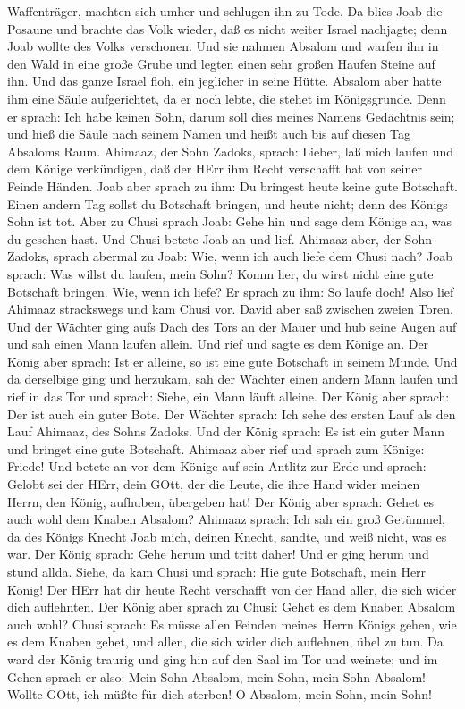 Waffenträger, machten sich umher und schlugen ihn zu Tode. 
Da blies Joab die Posaune und brachte das Volk wieder, daß es nicht
weiter Israel nachjagte; denn Joab wollte des Volks verschonen.
 Und sie nahmen Absalom und warfen ihn in den Wald in eine
große Grube und legten einen sehr großen Haufen Steine auf ihn. Und das
ganze Israel floh, ein jeglicher in seine Hütte.  Absalom
aber hatte ihm eine Säule aufgerichtet, da er noch lebte, die stehet im
Königsgrunde. Denn er sprach: Ich habe keinen Sohn, darum soll dies
meines Namens Gedächtnis sein; und hieß die Säule nach seinem Namen und
heißt auch bis auf diesen Tag Absaloms Raum.  Ahimaaz, der
Sohn Zadoks, sprach: Lieber, laß mich laufen und dem Könige verkündigen,
daß der HErr ihm Recht verschafft hat von seiner Feinde Händen.
 Joab aber sprach zu ihm: Du bringest heute keine gute
Botschaft. Einen andern Tag sollst du Botschaft bringen, und heute
nicht; denn des Königs Sohn ist tot.  Aber zu Chusi sprach
Joab: Gehe hin und sage dem Könige an, was du gesehen hast. Und Chusi
betete Joab an und lief.  Ahimaaz aber, der Sohn Zadoks,
sprach abermal zu Joab: Wie, wenn ich auch liefe dem Chusi nach? Joab
sprach: Was willst du laufen, mein Sohn? Komm her, du wirst nicht eine
gute Botschaft bringen.  Wie, wenn ich liefe? Er sprach zu
ihm: So laufe doch! Also lief Ahimaaz strackswegs und kam Chusi vor.
 David aber saß zwischen zweien Toren. Und der Wächter ging
aufs Dach des Tors an der Mauer und hub seine Augen auf und sah einen
Mann laufen allein.  Und rief und sagte es dem Könige an.
Der König aber sprach: Ist er alleine, so ist eine gute Botschaft in
seinem Munde. Und da derselbige ging und herzukam,  sah der
Wächter einen andern Mann laufen und rief in das Tor und sprach: Siehe,
ein Mann läuft alleine. Der König aber sprach: Der ist auch ein guter
Bote.  Der Wächter sprach: Ich sehe des ersten Lauf als den
Lauf Ahimaaz, des Sohns Zadoks. Und der König sprach: Es ist ein guter
Mann und bringet eine gute Botschaft.  Ahimaaz aber rief
und sprach zum Könige: Friede! Und betete an vor dem Könige auf sein
Antlitz zur Erde und sprach: Gelobt sei der HErr, dein GOtt, der die
Leute, die ihre Hand wider meinen Herrn, den König, aufhuben, übergeben
hat!  Der König aber sprach: Gehet es auch wohl dem Knaben
Absalom? Ahimaaz sprach: Ich sah ein groß Getümmel, da des Königs Knecht
Joab mich, deinen Knecht, sandte, und weiß nicht, was es war.
 Der König sprach: Gehe herum und tritt daher! Und er ging
herum und stund allda.  Siehe, da kam Chusi und sprach: Hie
gute Botschaft, mein Herr König! Der HErr hat dir heute Recht verschafft
von der Hand aller, die sich wider dich auflehnten.  Der
König aber sprach zu Chusi: Gehet es dem Knaben Absalom auch wohl? Chusi
sprach: Es müsse allen Feinden meines Herrn Königs gehen, wie es dem
Knaben gehet, und allen, die sich wider dich auflehnen, übel zu tun.
 Da ward der König traurig und ging hin auf den Saal im Tor
und weinete; und im Gehen sprach er also: Mein Sohn Absalom, mein Sohn,
mein Sohn Absalom! Wollte GOtt, ich müßte für dich sterben! O Absalom,
mein Sohn, mein Sohn!


